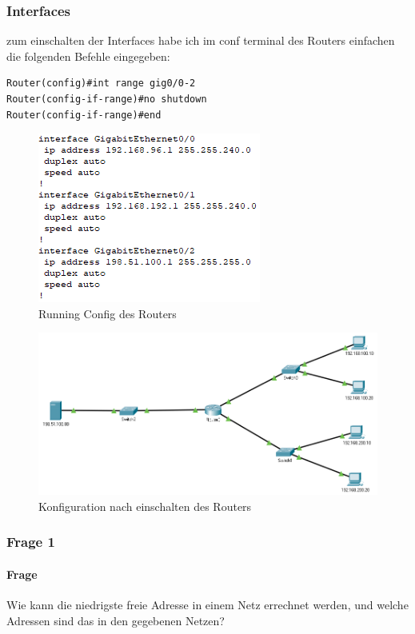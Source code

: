 \subsubsection{Interfaces}
zum einschalten der Interfaces habe ich im conf terminal des Routers einfachen die folgenden Befehle eingegeben:
\begin{lstlisting}
Router(config)#int range gig0/0-2
Router(config-if-range)#no shutdown
Router(config-if-range)#end
\end{lstlisting}
\begin{figure}[!htb]
    \centering
    \includegraphics[width=\textwidth,height=.35\textwidth,keepaspectratio]{./img/config/interfaces.png}
    \caption{Running Config des Routers}
\end{figure}
\begin{figure}[!htb]
    \centering
    \includegraphics[width=\textwidth,height=.6\textwidth,keepaspectratio]{./img/config/end.png}
    \caption{Konfiguration nach einschalten des Routers}
\end{figure}
\FloatBarrier

\subsubsection{Frage 1}
\paragraph{Frage}
Wie kann die niedrigste freie Adresse in einem Netz errechnet werden,
und welche Adressen sind das in den gegebenen Netzen?
